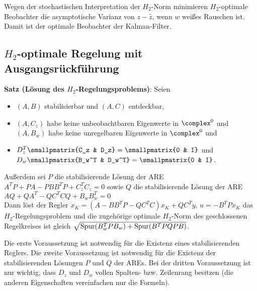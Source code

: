 Wegen der stochastischen Interpretation der $H_2$-Norm minimieren
$H_2$-optimale Beobachter die asymptotische Varianz von $z - \widehat{z}$,
wenn $w$ weißes Rauschen ist.
Damit ist der optimale Beobachter der Kalman-Filter.

\subsection{%
    \texorpdfstring{$H_2$-optimale}{H₂-optimale} Regelung mit Ausgangsrückführung%
}

\textbf{Satz (Lösung des $H_2$-Regelungsproblems)}:
Seien
\begin{itemize}
    \item
    $(A, B)$ stabilisierbar und $(A, C)$ entdeckbar,
    
    \item
    $(A, C_z)$ habe keine unbeobachtbaren Eigenwerte in $\complex^0$ und\\
    $(A, B_w)$ habe keine unregelbaren Eigenwerte in $\complex^0$ und
    
    \item
    $D_z^T \smallpmatrix{C_z & D_z} = \smallpmatrix{0 & I}$ und
    $D_w \smallpmatrix{B_w^T & D_w^T} = \smallpmatrix{0 & I}$.
\end{itemize}
Außerdem sei $P$ die stabilisierende Lösung der ARE $A^T P + PA - PBB^T P + C_z^T C_z = 0$
sowie $Q$ die stabilisierende Lösung der ARE $AQ + QA^T - QC^T CQ + B_w B_w^T = 0$\\
Dann löst der Regler
$\dot{x}_K = (A - BB^T P - QC^T C) x_K + QC^T y$, $u = -B^T P x_K$
das $H_2$-Regelungsproblem und die zugehörige optimale $H_2$-Norm des geschlossenen Regelkreises
ist gleich
$\sqrt{\operatorname{Spur}(B_w^T P B_w) + \operatorname{Spur}(B^T PQPB)}$.

Die erste Voraussetzung ist notwendig für die Existenz eines stabilisierenden Reglers.
Die zweite Voraussetzung ist notwendig für die Existenz der stabilisierenden Lösungen $P$ und $Q$
der AREs.
Bei der dritten Voraussetzung ist nur wichtig, dass $D_z$ und $D_w$ vollen Spalten- bzw.
Zeilenrang besitzen (die anderen Eigenschaften vereinfachen nur die Formeln).

\pagebreak
